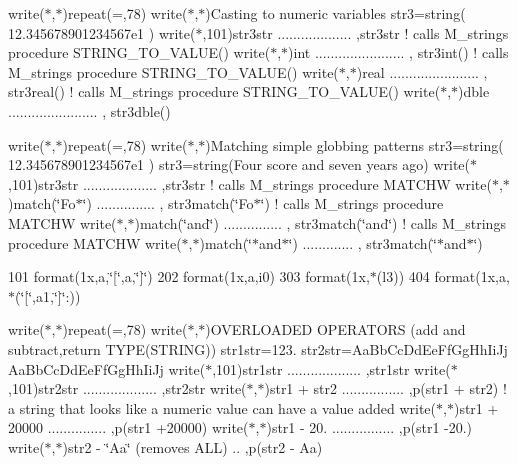 write($\ast$,$\ast$)repeat(\textquotesingle{}=\textquotesingle{},78) write($\ast$,$\ast$)\textquotesingle{}Casting to numeric variables\textquotesingle{} str3=string(\textquotesingle{} 12.\+345678901234567e1 \textquotesingle{}) write($\ast$,101)\textquotesingle{}str3str ................... \textquotesingle{},str3str ! calls M\+\_\+strings procedure S\+T\+R\+I\+N\+G\+\_\+\+T\+O\+\_\+\+V\+A\+L\+U\+E() write($\ast$,$\ast$)\textquotesingle{}int ....................... \textquotesingle{}, str3int() ! calls M\+\_\+strings procedure S\+T\+R\+I\+N\+G\+\_\+\+T\+O\+\_\+\+V\+A\+L\+U\+E() write($\ast$,$\ast$)\textquotesingle{}real ....................... \textquotesingle{}, str3real() ! calls M\+\_\+strings procedure S\+T\+R\+I\+N\+G\+\_\+\+T\+O\+\_\+\+V\+A\+L\+U\+E() write($\ast$,$\ast$)\textquotesingle{}dble ....................... \textquotesingle{}, str3dble()

write($\ast$,$\ast$)repeat(\textquotesingle{}=\textquotesingle{},78) write($\ast$,$\ast$)\textquotesingle{}Matching simple globbing patterns\textquotesingle{} str3=string(\textquotesingle{} 12.\+345678901234567e1 \textquotesingle{}) str3=string(\textquotesingle{}Four score and seven years ago\textquotesingle{}) write($\ast$,101)\textquotesingle{}str3str ................... \textquotesingle{},str3str ! calls M\+\_\+strings procedure M\+A\+T\+C\+HW write($\ast$,$\ast$)\textquotesingle{}match(\char`\"{}\+Fo$\ast$\char`\"{}) ............... \textquotesingle{}, str3match(\char`\"{}\+Fo$\ast$\char`\"{}) ! calls M\+\_\+strings procedure M\+A\+T\+C\+HW write($\ast$,$\ast$)\textquotesingle{}match(\char`\"{}and\char`\"{}) ............... \textquotesingle{}, str3match(\char`\"{}and\char`\"{}) ! calls M\+\_\+strings procedure M\+A\+T\+C\+HW write($\ast$,$\ast$)\textquotesingle{}match(\char`\"{}$\ast$and$\ast$\char`\"{}) ............. \textquotesingle{}, str3match(\char`\"{}$\ast$and$\ast$\char`\"{})

101 format(1x,a,\char`\"{}\mbox{[}\char`\"{},a,\char`\"{}\mbox{]}\char`\"{}) 202 format(1x,a,i0) 303 format(1x,$\ast$(l3)) 404 format(1x,a,$\ast$(\char`\"{}\mbox{[}\char`\"{},a1,\char`\"{}\mbox{]}\char`\"{}\+:))

write($\ast$,$\ast$)repeat(\textquotesingle{}=\textquotesingle{},78) write($\ast$,$\ast$)\textquotesingle{}O\+V\+E\+R\+L\+O\+A\+D\+ED O\+P\+E\+R\+A\+T\+O\+RS (add and subtract,return T\+Y\+P\+E(\+S\+T\+R\+I\+N\+G))\textquotesingle{} str1str=\textquotesingle{}123.\textquotesingle{} str2str=\textquotesingle{}Aa\+Bb\+Cc\+Dd\+Ee\+Ff\+Gg\+Hh\+Ii\+Jj Aa\+Bb\+Cc\+Dd\+Ee\+Ff\+Gg\+Hh\+Ii\+Jj\textquotesingle{} write($\ast$,101)\textquotesingle{}str1str ................... \textquotesingle{},str1str write($\ast$,101)\textquotesingle{}str2str ................... \textquotesingle{},str2str write($\ast$,$\ast$)\textquotesingle{}str1 + str2 ................ \textquotesingle{},p(str1 + str2) ! a string that looks like a numeric value can have a value added write($\ast$,$\ast$)\textquotesingle{}str1 + 20000 ............... \textquotesingle{},p(str1 +20000) write($\ast$,$\ast$)\textquotesingle{}str1 -\/ 20. ................ \textquotesingle{},p(str1 -\/20.) write($\ast$,$\ast$)\textquotesingle{}str2 -\/ \char`\"{}\+Aa\char`\"{} (removes A\+LL) .. \textquotesingle{},p(str2 -\/ \textquotesingle{}Aa\textquotesingle{})

